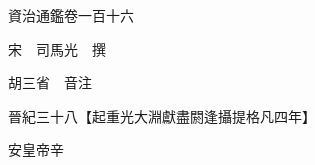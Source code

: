










 


 
 


 

  
  
  
  
  





  
  
  
  
  
 
  

  

  
  
  



  

 
 

  
   




  

  
  


  　　資治通鑑卷一百十六

　　宋　司馬光　撰

　　胡三省　音注

　　晉紀三十八【起重光大淵獻盡閼逢攝提格凡四年】

　　安皇帝辛

